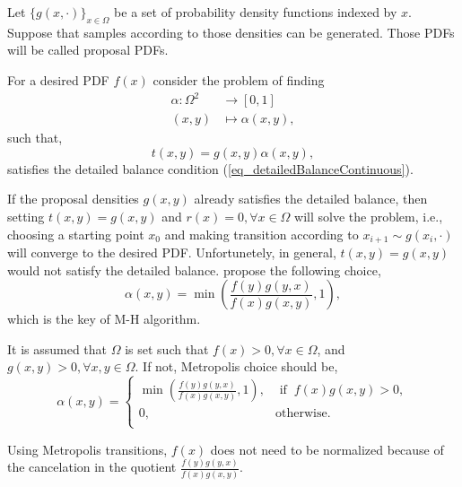 Let $\{g(x,\cdot)\}_{x\in\Omega}$ be a set of probability density functions indexed by $x$. 
Suppose that samples according to those densities can be generated.
Those PDFs will be called proposal PDFs.

For a desired PDF $f(x)$ consider the problem of finding 
$$
 \begin{aligned}
  \alpha: \Omega^2 &\to [0,1] \\
             (x,y) &\mapsto \alpha(x,y),
 \end{aligned}
$$
such that,
$$
  t(x,y) = g(x,y)\alpha(x,y),
$$
satisfies the detailed balance condition (\ref{eq_detailedBalanceContinuous}).

If the proposal densities $g(x,y)$ already satisfies the detailed balance, then setting $t(x,y) = g(x,y)$ and $r(x)=0, \forall x\in\Omega$ will solve the problem, i.e., choosing a starting point $x_0$ and making transition according to $x_{i+1} \sim g(x_i,\cdot)$ will converge to the desired PDF.
Unfortunetely, in general, $t(x,y) = g(x,y)$ would not satisfy the detailed balance. 
\textcite{metropolis1953} propose the following choice,
\begin{equation} \label{eq_metropolisChoice}
  \alpha(x,y) = \min\left( \frac{f(y)g(y,x)}{f(x)g(x,y)} , 1 \right),
\end{equation}
which is the key of M-H algorithm.

\begin{remark}
  It is assumed that $\Omega$ is set such that $f(x) > 0, \forall x\in\Omega$, and $g(x,y) > 0, \forall x,y\in\Omega$. If not, Metropolis choice should be,
$$
  \alpha(x,y) = \left\{ \begin{array}{cc}
    \min\left( \frac{f(y)g(y,x)}{f(x)g(x,y)} , 1 \right), & \text{ if } \ f(x)g(x,y) > 0, \\
      0, & \text{otherwise.}  \\
  \end{array} \right. 
$$ 
\end{remark}

\begin{remark}
  Using Metropolis transitions, $f(x)$ does not need to be normalized because of the cancelation in the quotient $\frac{f(y)g(y,x)}{f(x)g(x,y)}$.
\end{remark}

